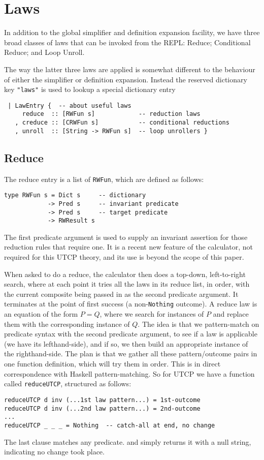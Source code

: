 \section{Laws}\label{sec:Laws}

In addition to the global simplifier and definition expansion facility,
we have three broad classes of laws that can be invoked from the REPL:
Reduce; Conditional Reduce; and Loop Unroll.

The way the latter three laws are applied is somewhat different
to the behaviour of either the simplifier or definition expansion.
Instead the reserved dictionary key \verb$"laws"$ is used
to lookup a special dictionary entry
\begin{verbatim}
 | LawEntry {  -- about useful laws
     reduce  :: [RWFun s]            -- reduction laws
   , creduce :: [CRWFun s]           -- conditional reductions
   , unroll  :: [String -> RWFun s]  -- loop unrollers }
\end{verbatim}

\subsection{Reduce}

The reduce entry is a list of \texttt{RWFun},
which are defined as follows:
\begin{verbatim}
type RWFun s = Dict s     -- dictionary
            -> Pred s     -- invariant predicate
            -> Pred s     -- target predicate
            -> RWResult s
\end{verbatim}
The first predicate argument is used to supply an invariant
assertion for those reduction rules that require one.
It is a recent new feature of the calculator, 
not required for this UTCP theory,
and its use is beyond the scope of this paper.



When asked to do a reduce,
the calculator then does a top-down, left-to-right search,
where at each point it tries all the laws in its reduce list, in order,
with the current composite being passed in as the second predicate
argument.
It terminates at the point of first success (a non-\texttt{Nothing} outcome).
A reduce law is an equation of the form $P = Q$,
where we search for instances of $P$ and replace them with the
corresponding instance of $Q$.
The idea is that we pattern-match on predicate syntax
with the second predicate argument,
to see if a law is applicable (we have its lefthand-side),
and if so,
we then build an appropriate instance of the righthand-side.
The plan is that we gather all these pattern/outcome pairs
in one function definition,
which will try them in order.
This is in direct correspondence with Haskell pattern-matching.
So for UTCP we have a function called \texttt{reduceUTCP},
structured as follows:
\begin{verbatim}
reduceUTCP d inv (...1st law pattern...) = 1st-outcome
reduceUTCP d inv (...2nd law pattern...) = 2nd-outcome
...
reduceUTCP _ _ _ = Nothing  -- catch-all at end, no change
\end{verbatim}
The last clause matches any predicate.
and simply returns it with a null string,
indicating no change took place.

